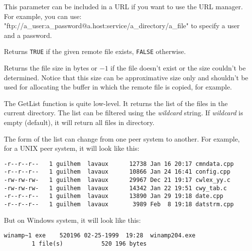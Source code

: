 This parameter can be included in a URL if you want to use the URL manager.
For example, you can use: "ftp://a\_user:a\_password@a.host:service/a\_directory/a\_file"
to specify a user and a password.


\label{wxftpfileexists}


Returns {\tt TRUE} if the given remote file exists, {\tt FALSE} otherwise.

\label{wxftpgetfilesize}


Returns the file size in bytes or $-1$ if the file doesn't exist or the size
couldn't be determined. Notice that this size can be approximative size only
and shouldn't be used for allocating the buffer in which the remote file is
copied, for example.

\label{wxftpgetdirlist}


The GetList function is quite low-level. It returns the list of the files in
the current directory. The list can be filtered using the {\it wildcard} string.
If {\it wildcard} is empty (default), it will return all files in directory.

The form of the list can change from one peer system to another. For example,
for a UNIX peer system, it will look like this:

\begin{verbatim}
-r--r--r--   1 guilhem  lavaux      12738 Jan 16 20:17 cmndata.cpp
-r--r--r--   1 guilhem  lavaux      10866 Jan 24 16:41 config.cpp
-rw-rw-rw-   1 guilhem  lavaux      29967 Dec 21 19:17 cwlex_yy.c
-rw-rw-rw-   1 guilhem  lavaux      14342 Jan 22 19:51 cwy_tab.c
-r--r--r--   1 guilhem  lavaux      13890 Jan 29 19:18 date.cpp
-r--r--r--   1 guilhem  lavaux       3989 Feb  8 19:18 datstrm.cpp
\end{verbatim}

But on Windows system, it will look like this:

\begin{verbatim}
winamp~1 exe    520196 02-25-1999  19:28  winamp204.exe
        1 file(s)           520 196 bytes
\end{verbatim}

